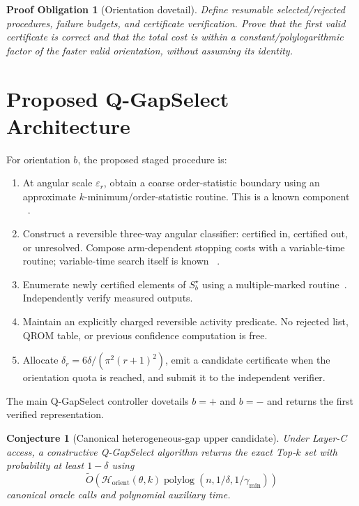 \documentclass[10pt]{article}
\newtheorem{conjecture}{Conjecture}
\newtheorem{obligation}{Proof Obligation}
\theoremstyle{definition}
\newcommand{\polylog}{\operatorname{polylog}}
\newcommand{\eps}{\varepsilon}
\begin{document}
\begin{obligation}[Orientation dovetail]
Define resumable selected/rejected procedures, failure budgets, and certificate
verification.  Prove that the first valid certificate is correct and that the
total cost is within a constant/polylogarithmic factor of the faster valid
orientation, without assuming its identity.
\end{obligation}

\section{Proposed Q-GapSelect Architecture}

For orientation $b$, the proposed staged procedure is:
\begin{enumerate}[leftmargin=*,label=\textbf{Step \arabic*.}]
  \item At angular scale $\eps_r$, obtain a coarse order-statistic boundary using
  an approximate $k$-minimum/order-statistic routine.  This is a known component
  ~\cite{gao2025approxkmin,nayak1999median}.
  \item Construct a reversible three-way angular classifier: certified in,
  certified out, or unresolved.  Compose arm-dependent stopping costs with a
  variable-time routine; variable-time search itself is known
  ~\cite{ambainis2023variable}.
  \item Enumerate newly certified elements of $S_b^\star$ using a multiple-marked
  routine~\cite{vanapeldoorn2024marked}.  Independently verify measured outputs.
  \item Maintain an explicitly charged reversible activity predicate.  No rejected
  list, QROM table, or previous confidence computation is free.
  \item Allocate $\delta_r=6\delta/(\pi^2(r+1)^2)$, emit a candidate certificate
  when the orientation quota is reached, and submit it to the independent
  verifier.
\end{enumerate}
The main Q-GapSelect controller dovetails $b=+$ and $b=-$ and returns the first
verified representation.

\begin{conjecture}[Canonical heterogeneous-gap upper candidate]
Under Layer-C access, a constructive Q-GapSelect algorithm returns the exact
Top-$k$ set with probability at least $1-\delta$ using
\begin{equation}
\widetilde O\!\left(
\mathcal H_{\mathrm{orient}}(\theta,k)
\polylog(n,1/\delta,1/\gamma_{\min})
\right)
\label{eq:canonicalupper}
\end{equation}
canonical oracle calls and polynomial auxiliary time.
\end{conjecture}
\end{document}

